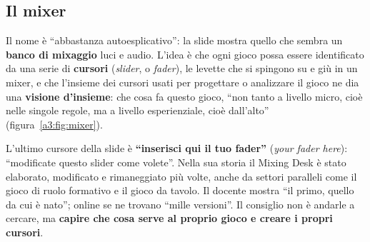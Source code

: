 \subsection{Il mixer}



Il nome è ``abbastanza autoesplicativo'': la slide mostra quello che sembra un
\textbf{banco di mixaggio} luci e audio. L'idea è che ogni gioco possa essere
identificato da una serie di \textbf{cursori} (\emph{slider}, o \emph{fader}),
le levette che si spingono su e giù in un mixer, e che l'insieme dei cursori
usati per progettare o analizzare il gioco ne dia una \textbf{visione
d'insieme}: che cosa fa questo gioco, ``non tanto a livello micro, cioè nelle
singole regole, ma a livello esperienziale, cioè dall'alto''
(figura~\ref{a3:fig:mixer}).

L'ultimo cursore della slide è \textbf{``inserisci qui il tuo fader''}
(\emph{your fader here}): ``modificate questo slider come volete''. Nella sua
storia il Mixing Desk è stato elaborato, modificato e rimaneggiato più volte,
anche da settori paralleli come il gioco di ruolo formativo e il gioco da tavolo.
Il docente mostra ``il primo, quello da cui è nato''; online se ne trovano
``mille versioni''. Il consiglio non è andarle a cercare, ma \textbf{capire che
cosa serve al proprio gioco e creare i propri cursori}.


